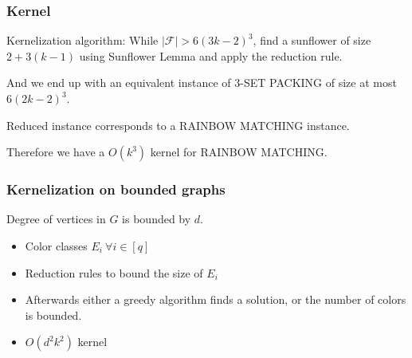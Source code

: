 \documentclass{beamer}
\begin{document}
\begin{frame}
    \frametitle{Kernel}
    
    \begin{block}{Kernelization algorithm:}
        While $|\mathcal{F}| > 6 (3k-2)^3$, find a sunflower of size $2 + 3(k - 1)$ using Sunflower Lemma and apply the reduction rule.

        And we end up with an equivalent instance of 3-SET PACKING of size at most $6 (2k - 2)^3$.
    \end{block}
    \pause

    \vspace{5mm}
    Reduced instance corresponds to a RAINBOW MATCHING instance.

    Therefore we have a $O(k^3)$ kernel for RAINBOW MATCHING.
\end{frame}

\begin{frame}
    \frametitle{Kernelization on bounded graphs}

    Degree of vertices in $G$ is bounded by $d$.

            \pause
    \begin{itemize}
        \item Color classes $E_i ~ \forall i \in [q]$
            \pause
        \item Reduction rules to bound the size of $E_i$
            \pause
        \item Afterwards either a greedy algorithm finds a solution, or the number of colors is bounded.
            \pause
        \item $O(d^2 k^2)$ kernel
    \end{itemize}
    
\end{frame}
\end{document}
